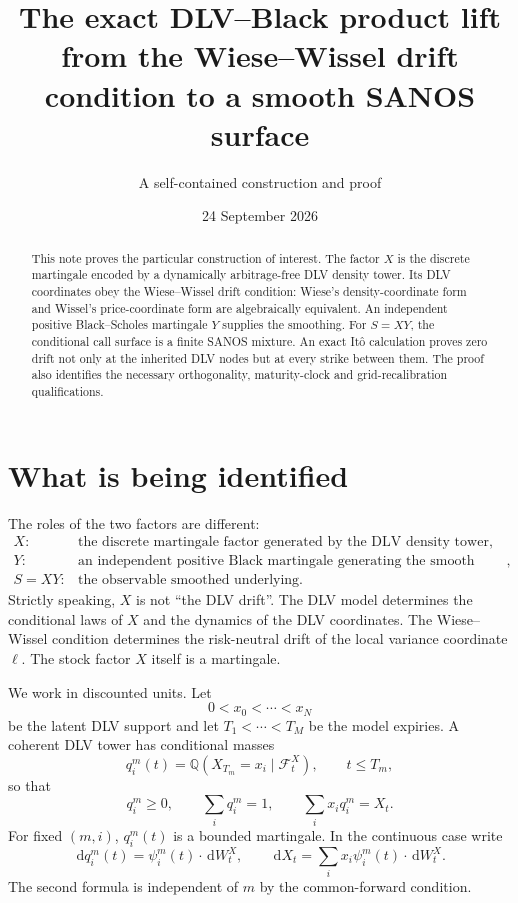 \documentclass[11pt,a4paper]{article}
\title{The exact DLV--Black product lift\\
from the Wiese--Wissel drift condition to a smooth SANOS surface}
\author{A self-contained construction and proof}
\date{24 September 2026}
\newcommand{\Q}{\mathbb Q}
\newcommand{\F}{\mathcal F}
\newcommand{\dd}{\,\mathrm d}
\begin{document}
\maketitle

\begin{abstract}
This note proves the particular construction of interest.  The factor $X$ is
the discrete martingale encoded by a dynamically arbitrage-free DLV density
tower.  Its DLV coordinates obey the Wiese--Wissel drift condition: Wiese's
density-coordinate form and Wissel's price-coordinate form are algebraically
equivalent.
An independent positive Black--Scholes martingale $Y$ supplies the smoothing.
For $S=XY$, the conditional call surface is a finite SANOS mixture.  An exact
It\^o calculation proves zero drift not only at the inherited DLV nodes but at
every strike between them.  The proof also identifies the necessary
orthogonality, maturity-clock and grid-recalibration qualifications.
\end{abstract}

\section{What is being identified}

The roles of the two factors are different:
\begin{equation}
 \boxed{
 \begin{array}{ll}
 X:&\text{the discrete martingale factor generated by the DLV density tower},\\[1mm]
 Y:&\text{an independent positive Black martingale generating the smooth kernel},\\[1mm]
 S=XY:&\text{the observable smoothed underlying.}
 \end{array}}
 \label{eq:roles}
\end{equation}
Strictly speaking, $X$ is not ``the DLV drift''.  The DLV model determines the
conditional laws of $X$ and the dynamics of the DLV coordinates.  The
Wiese--Wissel condition determines the risk-neutral drift of the local
variance coordinate $\ell$.  The stock factor $X$ itself is a martingale.

We work in discounted units.  Let
\[
 0<x_0<\cdots<x_N
\]
be the latent DLV support and let $T_1<\cdots<T_M$ be the model expiries.  A
coherent DLV tower has conditional masses
\begin{equation}
 q_i^m(t)=\Q(X_{T_m}=x_i\mid\F_t^X),
 \qquad t\leq T_m,
 \label{eq:qconditional}
\end{equation}
so that
\begin{equation}
 q_i^m\geq0,\qquad \sum_iq_i^m=1,\qquad
 \sum_i x_iq_i^m=X_t .
 \label{eq:massmean}
\end{equation}
For fixed $(m,i)$, $q_i^m(t)$ is a bounded martingale.  In the continuous case
write
\begin{equation}
 \dd q_i^m(t)=\psi_i^m(t)\cdot\dd W_t^X,
 \qquad
 \dd X_t=\sum_i x_i\psi_i^m(t)\cdot\dd W_t^X.
 \label{eq:qdynamics}
\end{equation}
The second formula is independent of $m$ by the common-forward condition.
\end{document}
